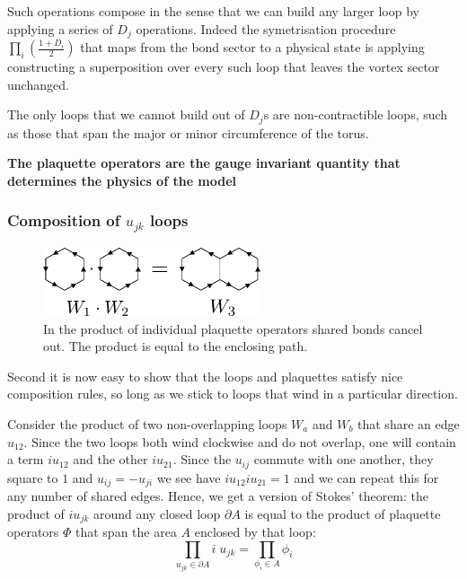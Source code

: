 Such operations compose in the sense that we can build any larger loop
by applying a series of \(D_j\) operations. Indeed the symetrisation
procedure \(\prod_i \left( \frac{1 + D_i}{2}\right)\) that maps from the
bond sector to a physical state is applying constructing a superposition
over every such loop that leaves the vortex sector unchanged.

The only loops that we cannot build out of \(D_j\)s are non-contractible
loops, such as those that span the major or minor circumference of the
torus.

\textbf{The plaquette operators are the gauge invariant quantity that
determines the physics of the model}

\hypertarget{composition-of-u_jk-loops}{%
\subsubsection{\texorpdfstring{Composition of \(u_{jk}\)
loops}{Composition of u\_\{jk\} loops}}\label{composition-of-u_jk-loops}}

\begin{figure}
\hypertarget{fig:plaquette_addition_by_hand}{%
\centering
\includegraphics[width=0.57\textwidth,height=\textheight]{figure_code/amk_chapter/plaquette_addition/plaquette_addition_by_hand.pdf}
\caption{In the product of individual plaquette operators shared bonds
cancel out. The product is equal to the enclosing
path.}\label{fig:plaquette_addition_by_hand}
}
\end{figure}

Second it is now easy to show that the loops and plaquettes satisfy nice
composition rules, so long as we stick to loops that wind in a
particular direction.

Consider the product of two non-overlapping loops \(W_a\) and \(W_b\)
that share an edge \(u_{12}\). Since the two loops both wind clockwise
and do not overlap, one will contain a term \(i u_{12}\) and the other
\(i u_{21}\). Since the \(u_{ij}\) commute with one another, they square
to \(1\) and \(u_{ij} = -u_{ji}\) we see have \(i u_{12} i u_{21} = 1\)
and we can repeat this for any number of shared edges. Hence, we get a
version of Stokes' theorem: the product of \(i u_{jk}\) around any
closed loop \(\partial A\) is equal to the product of plaquette
operators \(\Phi\) that span the area \(A\) enclosed by that loop:
\[\prod_{u_{jk} \in \partial A} i \; u_{jk} = \prod_{\phi_i \in A} \phi_i\]

